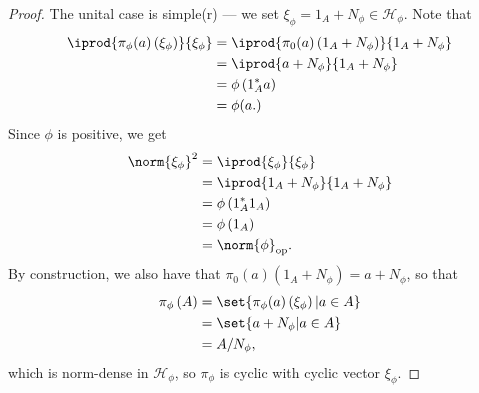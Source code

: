 \documentclass[10pt]{mypackage}
\DeclareMathOperator{\op}{op}
\begin{document}
\begin{proof}
  The unital case is simple(r) --- we set $\xi_{\phi} = 1_A + N_{\phi}\in \mathcal{H}_{\phi}$. Note that
  \begin{align*}
    \iprod{\pi_{\phi}(a)\left(\xi_{\phi}\right)}{\xi_{\phi}} &= \iprod{\pi_0(a)\left(1_A + N_{\phi}\right)}{1_A + N_{\phi}}\\
                                                             &= \iprod{a + N_{\phi}}{1_A + N_{\phi}}\\
                                                             &= \phi\left(1_A^{\ast}a\right)\\
                                                             &= \phi(a.)
  \end{align*}
  Since $\phi$ is positive, we get
  \begin{align*}
    \norm{\xi_{\phi}}^2 &= \iprod{\xi_{\phi}}{\xi_{\phi}}\\
                        &= \iprod{1_A + N_{\phi}}{1_A + N_{\phi}}\\
                        &= \phi\left(1_A^{\ast}1_A\right)\\
                        &= \phi\left(1_A\right)\\
                        &= \norm{\phi}_{\op}.
  \end{align*}
  By construction, we also have that $\pi_0(a)\left(1_A + N_{\phi}\right) = a + N_{\phi}$, so that
  \begin{align*}
    \pi_{\phi}\left(A\right) &= \set{\pi_{\phi}(a)\left(\xi_{\phi}\right) | a\in A}\\
                             &= \set{a + N_{\phi} | a\in A}\\
                             &= A/N_{\phi},
  \end{align*}
  which is norm-dense in $\mathcal{H}_{\phi}$, so $\pi_{\phi}$ is cyclic with cyclic vector $\xi_{\phi}$.\newline


\end{proof}
\end{document}
